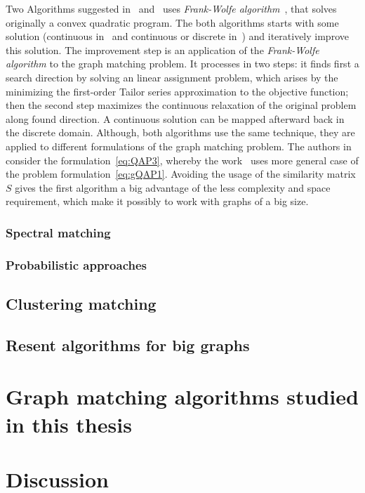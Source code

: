 Two Algorithms suggested in~\cite{Vogelstein_BrainGraphs} and~\cite{Leordeanu2009_IPFP} uses \emph{Frank-Wolfe algorithm}~\cite{Wolfe1956}, that solves originally a convex quadratic program. The both algorithms starts with some solution (continuous in~\cite{Vogelstein_BrainGraphs} and continuous or discrete in~\cite{Leordeanu2009_IPFP}) and iteratively improve this solution. The improvement step is an application of the \emph{Frank-Wolfe algorithm} to the graph matching problem. It processes in two steps: it finds first a search direction by solving an linear assignment problem, which arises by the minimizing the first-order Tailor series approximation to the objective function; then the second step maximizes the continuous relaxation of the original problem along found direction. A continuous solution can be mapped afterward back in the discrete domain. Although, both algorithms use the same technique, they are applied to different formulations of the graph matching problem. The authors in~\cite{Vogelstein_BrainGraphs} consider the formulation~\eqref{eq:QAP3}, whereby the work~\cite{Leordeanu2009_IPFP} uses more general case of the problem formulation~\eqref{eq:gQAP1}. Avoiding the usage of the similarity matrix $S$ gives the first algorithm a big advantage of the less complexity and space requirement, which make it possibly to work with graphs of a big size.





\subsubsection{Spectral matching}


\subsubsection{Probabilistic approaches}


\subsection{Clustering matching}

\subsection{Resent algorithms for big graphs}

\section{Graph matching algorithms studied in this thesis}

\section{Discussion}